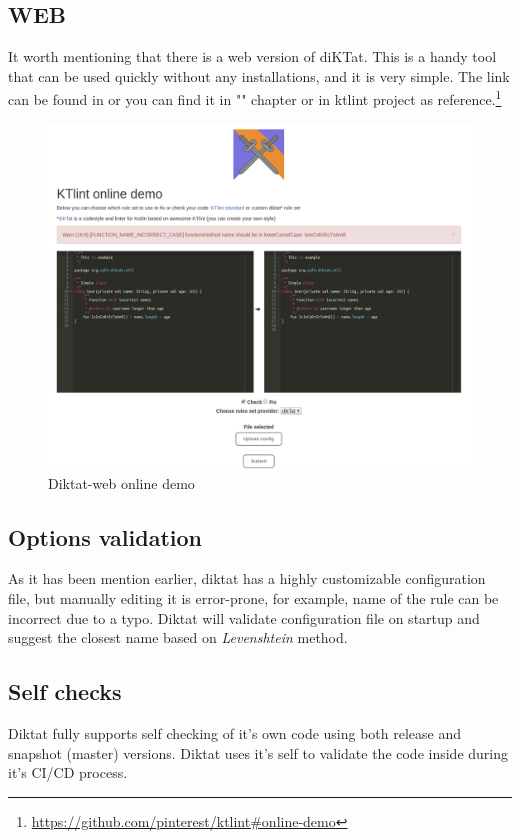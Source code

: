 \subsection{WEB}
It worth mentioning that there is a web version of diKTat. This is a handy tool that can be used quickly without any installations, and it is very simple. The link can be found in or you can find it in "" chapter or in ktlint project as reference.\footnote{\url{https://github.com/pinterest/ktlint\#online-demo}}
\begin{figure}[H]
  \centering
  \includegraphics[scale=0.3]{pictures/web-example.png}
  \caption{Diktat-web online demo} 
\end{figure} 

\subsection{Options validation}
As it has been mention earlier, diktat has a highly customizable configuration file, but manually editing it is error-prone, for example, name of the rule can be incorrect due to a typo. Diktat will validate configuration file on startup and suggest the closest name based on \textsl{Levenshtein} method.

\subsection{Self checks}
Diktat fully supports self checking of it's own code using both release and snapshot (master) versions. Diktat uses it's self to validate the code inside during it's CI/CD process. 
